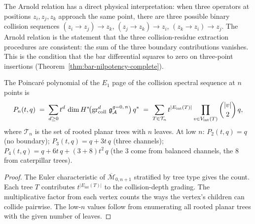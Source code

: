 \begin{remark}
\label{rem:thqg-V-arnold-collision}
The Arnold relation has a direct physical interpretation:
when three operators at positions $z_i, z_j, z_k$ approach
the same point, there are three possible binary collision
sequences $(z_i \to z_j) \to z_k$,
$(z_j \to z_k) \to z_i$,
$(z_k \to z_i) \to z_j$.
The Arnold relation is the statement that the three
collision-residue extraction procedures are consistent:
the sum of the three boundary contributions vanishes.
This is the condition that the bar differential
squares to zero on three-point insertions
(Theorem~\ref{thm:bar-nilpotency-complete}).
\end{remark}

\begin{proposition}
\label{prop:thqg-V-poincare-collision}
The Poincar\'e polynomial of the $E_1$ page of the collision
spectral sequence at $n$ points is
\begin{equation}\label{eq:thqg-V-poincare}
P_n(t,q)
\;=\;
\sum_{d \geq 0} t^d\,
\dim H^*\!\bigl(
 \operatorname{gr}_{\mathrm{coll}}^d\,\mathfrak{g}^{g{=}0,\,n}_{\mathcal{A}}
\bigr)\,q^{*}
\;=\;
\sum_{T \in \mathcal{T}_n}
t^{|E_{\mathrm{int}}(T)|}
\prod_{v \in V_{\mathrm{int}}(T)}
\binom{|v|}{2}\,q,
\end{equation}
where $\mathcal{T}_n$ is the set of rooted planar trees with
$n$ leaves. At low $n$:
$P_2(t,q) = q$ \textup{(}no boundary\textup{)};
$P_3(t,q) = q + 3t\,q$ \textup{(}three channels\textup{)};
$P_4(t,q) = q + 6t\,q + (3 + 8)t^2\,q$
\textup{(}the $3$ come from balanced channels,
the $8$ from caterpillar trees\textup{)}.
\end{proposition}

\begin{proof}
The Euler characteristic of $\overline{\mathcal{M}}_{0,n+1}$
stratified by tree type gives the count. Each tree $T$ contributes
$t^{|E_{\mathrm{int}}(T)|}$ to the collision-depth grading. The
multiplicative factor from each vertex counts the ways the
vertex's children can collide pairwise. The low-$n$ values
follow from enumerating all rooted planar trees with the given
number of leaves.
\end{proof}


%
%

